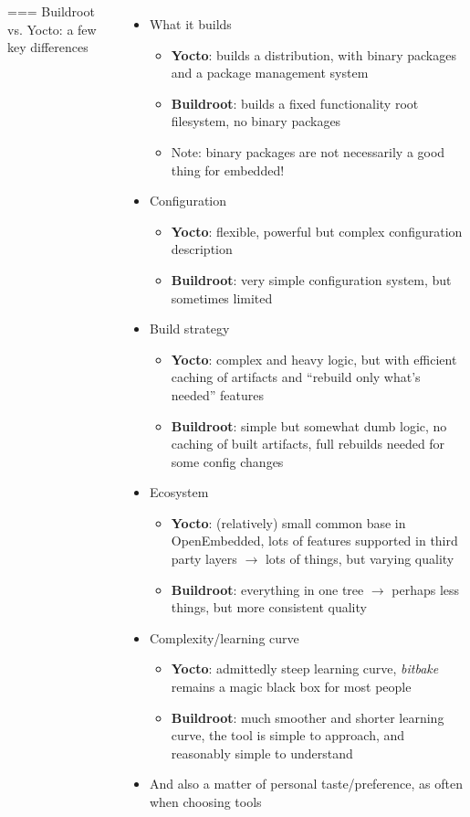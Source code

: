 \begin{columns}
=== {Buildroot vs. Yocto: a few key differences}
  \begin{itemize}
  \item What it builds
     {
      \begin{itemize}
      \item {\bf Yocto}: builds a distribution, with binary packages and a
        package management system
      \item {\bf Buildroot}: builds a fixed functionality root
        filesystem, no binary packages
      \item Note: binary packages are not necessarily a good thing for
        embedded!
      \end{itemize}
    }
    \pause
  \item Configuration
     {
      \begin{itemize}
      \item {\bf Yocto}: flexible, powerful but complex configuration
        description
      \item {\bf Buildroot}: very simple configuration system, but
        sometimes limited
      \end{itemize}
    }
    \pause
  \item Build strategy
     {
      \begin{itemize}
      \item {\bf Yocto}: complex and heavy logic, but with efficient
        caching of artifacts and ``rebuild only what's needed'' features
      \item {\bf Buildroot}: simple but somewhat dumb logic, no caching
        of built artifacts, full rebuilds needed for some config changes
      \end{itemize}
    }
    \pause
  \item Ecosystem
     {
      \begin{itemize}
      \item {\bf Yocto}: (relatively) small common base in OpenEmbedded,
        lots of features supported in third party layers $\rightarrow$
        lots of things, but varying quality
      \item {\bf Buildroot}: everything in one tree $\rightarrow$
        perhaps less things, but more consistent quality
      \end{itemize}
    }
    \pause
  \item Complexity/learning curve
     {
      \begin{itemize}
      \item {\bf Yocto}: admittedly steep learning curve, {\em bitbake}
        remains a magic black box for most people
      \item {\bf Buildroot}: much smoother and shorter learning curve,
        the tool is simple to approach, and reasonably simple to
        understand
      \end{itemize}
    }
    \pause
  \item And also a matter of personal taste/preference, as often when
    choosing tools
  \end{itemize}



\end{columns}
